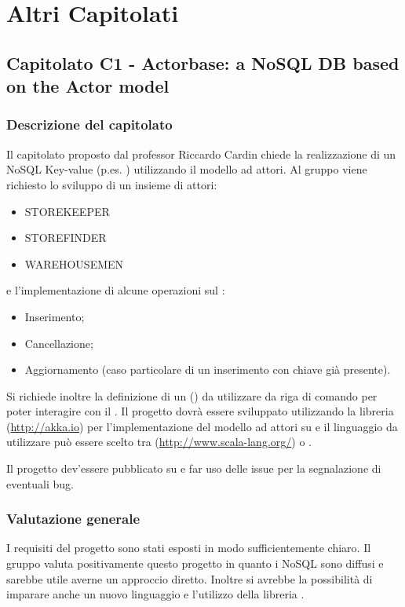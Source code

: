 \documentclass[a4paper, titlepage]{article}
\begin{document}
\newpage
\section{Altri Capitolati}

\subsection{Capitolato C1 - Actorbase: a NoSQL DB based on the Actor model}

\subsubsection{Descrizione del capitolato}
Il capitolato proposto dal professor Riccardo Cardin chiede la realizzazione di un  NoSQL Key-value  (p.es. ) utilizzando il modello ad attori.
Al gruppo viene richiesto lo sviluppo di un insieme di attori:
\begin{itemize}
	\item STOREKEEPER
	\item STOREFINDER
	\item WAREHOUSEMEN
\end{itemize}
e l'implementazione di alcune operazioni sul :
\begin{itemize}
	\item Inserimento;
	\item Cancellazione;
	\item Aggiornamento (caso particolare di un inserimento con chiave già presente).
\end{itemize}

Si richiede inoltre la definizione di un  () da utilizzare da riga di comando per poter interagire con il .
Il progetto dovrà essere sviluppato utilizzando la libreria  (\href{http://akka.io}{http://akka.io}) per l'implementazione del modello ad attori su  e il linguaggio da utilizzare può essere scelto tra  (\href{http://www.scala-lang.org/}{http://www.scala-lang.org/}) o .

Il progetto dev'essere pubblicato su  e far uso delle issue per la segnalazione di eventuali bug.

\subsubsection{Valutazione generale}
I requisiti del progetto sono stati esposti in modo sufficientemente chiaro. Il gruppo valuta positivamente questo progetto in quanto i  NoSQL sono diffusi e sarebbe utile averne un approccio diretto. Inoltre si avrebbe la possibilità di imparare anche un nuovo linguaggio  e l'utilizzo della libreria .
\end{document}
